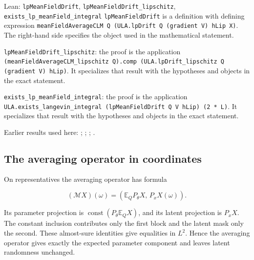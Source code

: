 \documentclass[11pt,a4paper]{report}
\begin{document}
\begin{leanbox}{Lean: \texttt{lpMeanFieldDrift}, \texttt{lpMeanFieldDrift\_\allowbreak{}lipschitz}, \texttt{exists\_\allowbreak{}lp\_\allowbreak{}meanField\_\allowbreak{}integral}}
\texttt{lp\allowbreak{}Mean\allowbreak{}Field\allowbreak{}Drift} is a definition with defining expression \texttt{mean\allowbreak{}Field\allowbreak{}Average\allowbreak{}CLM Q (ULA.\allowbreak{}lp\allowbreak{}Drift Q (gradient V) h\allowbreak{}Lip X)}. The right-hand side specifies the object used in the mathematical statement.



\texttt{lp\allowbreak{}Mean\allowbreak{}Field\allowbreak{}Drift\_\allowbreak{}lipschitz}: the proof is the application \texttt{(mean\allowbreak{}Field\allowbreak{}Average\allowbreak{}CLM\_\allowbreak{}lipschitz Q).\allowbreak{}comp (ULA.\allowbreak{}lp\allowbreak{}Drift\_\allowbreak{}lipschitz Q (gradient V) h\allowbreak{}Lip)}. It specializes that result with the hypotheses and objects in the exact statement.



\texttt{exists\_\allowbreak{}lp\_\allowbreak{}mean\allowbreak{}Field\_\allowbreak{}integral}: the proof is the application \texttt{ULA.\allowbreak{}exists\_\allowbreak{}langevin\_\allowbreak{}integral (lp\allowbreak{}Mean\allowbreak{}Field\allowbreak{}Drift Q V h\allowbreak{}Lip) (2 * L)}. It specializes that result with the hypotheses and objects in the exact statement.
\end{leanbox}


Earlier results used here: \cite[Section~3.13.2]{LangevinLean2026ULASC}; \cite[Section~3.13.5]{LangevinLean2026ULASC}; \cite[Section~3.14.3]{LangevinLean2026ULASC}; \cite[Section~3.1.1]{LangevinLean2026IPLA}.
\subsection{\texorpdfstring{The averaging operator in coordinates}{The averaging operator in coordinates}}
\label{report-step-ProximalLangevin-MeanFieldProcess-lean-6}


On representatives the averaging operator has formula

\[(\mathcal M X)(\omega)=(\mathbb E_Q P_\theta X,\,P_xX(\omega)).\]

Its parameter projection is \(\operatorname{const}(P_\theta\mathbb E_QX)\), and its latent projection is \(P_xX\). The constant inclusion contributes only the first block and the latent mask only the second. These almost-sure identities give equalities in \(L^2\). Hence the averaging operator gives exactly the expected parameter component and leaves latent randomness unchanged.
\end{document}
